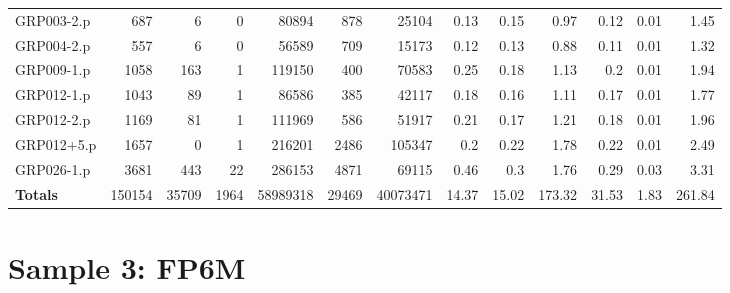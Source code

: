 \begin{table}[H]
\begin{adjustwidth}{-1.1in}{-0.5in}
\begin{tabular}{| l || r | r | r || r | r | r || r | r | r | r | r | r |}
GRP003-2.p&687&6&0&80894&878&25104&0.13&0.15&0.97&0.12&0.01&1.45\\
GRP004-2.p&557&6&0&56589&709&15173&0.12&0.13&0.88&0.11&0.01&1.32\\
GRP009-1.p&1058&163&1&119150&400&70583&0.25&0.18&1.13&0.2&0.01&1.94\\
GRP012-1.p&1043&89&1&86586&385&42117&0.18&0.16&1.11&0.17&0.01&1.77\\
GRP012-2.p&1169&81&1&111969&586&51917&0.21&0.17&1.21&0.18&0.01&1.96\\
GRP012+5.p&1657&0&1&216201&2486&105347&0.2&0.22&1.78&0.22&0.01&2.49\\
GRP026-1.p&3681&443&22&286153&4871&69115&0.46&0.3&1.76&0.29&0.03&3.31\\\hline \hline
\textbf{Totals}&150154&35709&1964&58989318&29469&40073471&14.37&15.02&173.32&31.53&1.83&261.84\\ \hline
\end{tabular}\end{adjustwidth}\end{table}

\section{Sample 3: FP6M}

